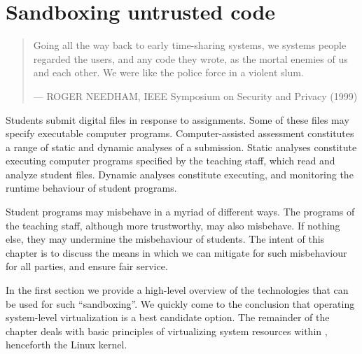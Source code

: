 
\chapter{Sandboxing untrusted code}

\begin{quotation}

\footnotesize\sffamily\itshape

\begin{flushright}

Going all the way back to early time-sharing systems, we systems people
regarded the users, and any code they wrote, as the mortal enemies of us and
each other. We were like the police force in a violent slum.

\smallbreak

\upshape

--- ROGER NEEDHAM, IEEE Symposium on Security and Privacy (1999)

\end{flushright}

\end{quotation}

Students submit digital files in response to assignments. Some of these files
may specify executable computer programs. Computer-assisted assessment
constitutes a range of static and dynamic analyses of a submission. Static
analyses constitute executing computer programs specified by the teaching
staff, which read and analyze student files. Dynamic analyses constitute
executing, and monitoring the runtime behaviour of student programs.

Student programs may misbehave in a myriad of different ways. The programs of
the teaching staff, although more trustworthy, may also misbehave. If nothing
else, they may undermine the misbehaviour of students. The intent of this
chapter is to discuss the means in which we can mitigate for such misbehaviour
for all parties, and ensure fair service.

In the first section we provide a high-level overview of the technologies that
can be used for such ``sandboxing''. We quickly come to the conclusion that
operating system-level virtualization is a best candidate option. The remainder
of the chapter deals with basic principles of virtualizing system resources
within \cite{linux-kernel-v3.14.2}, henceforth the Linux kernel.














